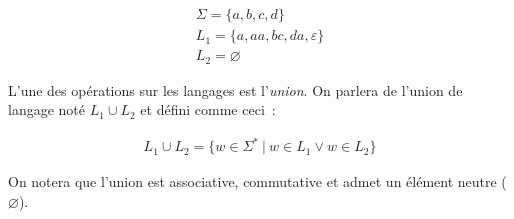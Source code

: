 \begin{example}
    \begin{gather*}
        \Sigma = \{a, b, c, d\} \\
        L_1 = \{a, aa, bc, da, \varepsilon\} \\
        L_2 = \varnothing
    \end{gather*}
\end{example}



\begin{definition}
    L'une des opérations sur les langages est l'\textit{union}. On parlera de
    l'union de langage noté \(L_1 \cup L_2\) et défini comme ceci~:

    \begin{gather*}
        L_1 \cup L_2 = \{w \in \Sigma ^ * ~|~ w \in L_1 \lor w \in L_2\}
    \end{gather*}

    \noindent On notera que l'union est associative, commutative et admet un
    élément neutre (\(\varnothing\)).
\end{definition}



